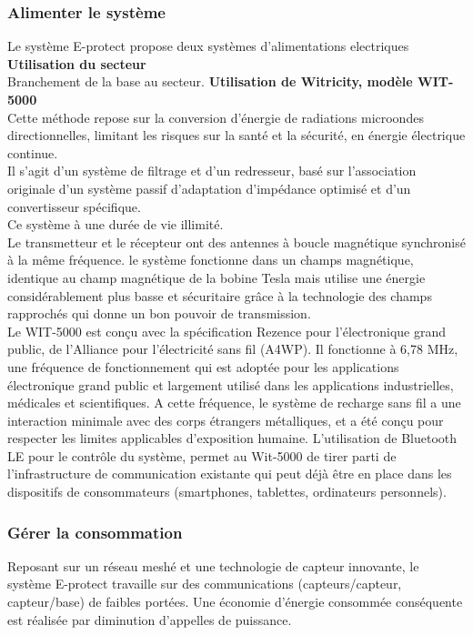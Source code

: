 \subsubsection{Alimenter le système}
Le système E-protect propose deux systèmes d'alimentations electriques
\textbf{Utilisation du secteur}\\
Branchement de la base au secteur. 
\textbf{Utilisation de Witricity, modèle WIT-5000}\\
Cette méthode repose sur la conversion d’énergie de radiations microondes directionnelles, limitant les risques sur la santé et la sécurité, en énergie électrique continue.\\
Il s’agit d’un système de filtrage et d’un redresseur, basé sur l’association originale d’un système passif d’adaptation d’impédance optimisé et d’un convertisseur spécifique.\\
Ce système à une durée de vie illimité.\\
Le  transmetteur et le récepteur ont des antennes à boucle magnétique synchronisé à la même fréquence. le système fonctionne dans un champs magnétique, identique au champ magnétique de la bobine Tesla mais utilise une énergie considérablement plus basse et sécuritaire grâce à la technologie des champs rapprochés qui donne un bon pouvoir de transmission.\\
Le WIT-5000 est conçu avec la spécification Rezence pour l'électronique grand public, de l'Alliance pour l'électricité sans fil (A4WP). Il fonctionne à 6,78 MHz, une fréquence de fonctionnement qui est adoptée pour les applications électronique grand public et largement utilisé dans les applications industrielles, médicales et scientifiques. A cette fréquence, le système de recharge sans fil a une interaction minimale avec des corps étrangers métalliques, et a été conçu pour respecter les limites applicables d'exposition humaine. L'utilisation de Bluetooth LE pour le contrôle du système, permet au Wit-5000 de tirer parti de l'infrastructure de communication existante qui peut déjà être en place dans les dispositifs de consommateurs (smartphones, tablettes, ordinateurs personnels).\cite{www:Witricity}

\subsubsection{Gérer la consommation}
Reposant sur un réseau meshé et une technologie de capteur innovante, le système E-protect travaille sur des communications (capteurs/capteur, capteur/base) de faibles portées. Une économie d'énergie consommée conséquente est réalisée par diminution d'appelles de puissance.\\
